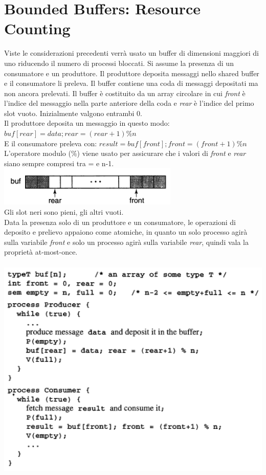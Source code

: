 \documentclass[10pt,a4paper]{book}
\begin{document}
\section{Bounded Buffers: Resource Counting}
Viste le considerazioni precedenti verrà usato un buffer di dimensioni maggiori di uno riducendo il numero di processi bloccati.
Si assume la presenza di un consumatore e un produttore. Il produttore deposita messaggi nello shared buffer e il consumatore li preleva. Il buffer contiene una coda di messaggi depositati ma non ancora prelevati. Il buffer è costituito da un array circolare in cui \textit{front} è l'indice del messaggio nella parte anteriore della coda e \textit{rear} è l'indice del primo slot vuoto. Inizialmente valgono entrambi 0.\\
Il produttore deposita un messaggio in questo modo:\\ $ buf[rear] = data; rear = (rear+1)\% n $\\
E il consumatore preleva con: $ result=buf[front]; front=(front+1)\%n $\\
L'operatore modulo (\%) viene usato per assicurare che i valori di \textit{front} e \textit{rear} siano sempre compresi tra = e n-1.\\
\includegraphics[scale=0.4]{img/arraycirc.png} \\
Gli slot neri sono pieni, gli altri vuoti.\\
Data la presenza solo di un produttore e un consumatore, le operazioni di deposito e prelievo appaiono come atomiche, in quanto un solo processo agirà sulla variabile \textit{front} e solo un processo agirà sulla variabile \textit{rear}, quindi vala la proprietà at-most-once.\\ \\
\includegraphics[scale=0.5]{img/bounded.png}\\
\end{document}

